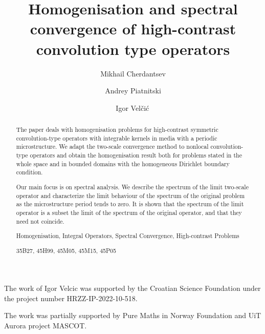 \documentclass[11pt]{article}
\theoremstyle{remark}
\begin{document}
	
\title{{\sc Homogenisation and spectral convergence of high-contrast convolution type operators}}


\author[1]{Mikhail Cherdantsev}
\author[2]{Andrey Piatnitski}
\author[3]{Igor Vel\v{c}i\'{c}\,}




\date{}
\maketitle

\vspace{-6mm}



The work of Igor Velcic was supported by the Croatian Science Foundation under the project number HRZZ-IP-2022-10-518.

The work was partially supported by Pure Maths in Norway Foundation and UiT Aurora project MASCOT.




\begin{abstract}
 The paper deals with homogenisation problems for high-contrast
symmetric convolution-type operators with integrable kernels in media
with a periodic microstructure.  We adapt the two-scale convergence method
to nonlocal convolution-type operators and obtain the homogenisation result
both for problems stated in the whole space and in bounded domains with the homogeneous Dirichlet
boundary condition.

Our main focus is on spectral  analysis. We describe the spectrum
of the limit two-scale operator  and characterize the limit behaviour of the spectrum of the original problem
as the microstructure period tends to zero. It is shown that the spectrum of the limit operator  is a subset
the limit  of the spectrum of the original operator, and that  they need not coincide.
\vskip 0.15cm

 Homogenisation, Integral Operators, Spectral Convergence, High-contrast Problems

\vskip 0.15cm

  35B27,   45H99, 45M05, 45M15, 45P05

\vskip 0.4cm



\end{abstract}
\end{document}
